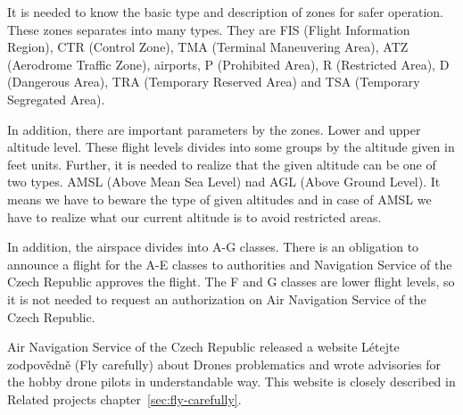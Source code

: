 It is needed to know the basic type and description of zones for safer operation. %
These zones separates into many types. %
They are FIS (Flight Information Region), CTR (Control Zone), TMA (Terminal Maneuvering Area), ATZ (Aerodrome Traffic Zone), airports, P (Prohibited Area), R (Restricted Area), D (Dangerous Area), TRA (Temporary Reserved Area) and TSA (Temporary Segregated Area).\cite{airspace}

In addition, there are important parameters by the zones.
Lower and upper altitude level.
These flight levels divides into some groups by the altitude given in feet units. %
Further, it is needed to realize that the given altitude can be one of two types. %
AMSL (Above Mean Sea Level) nad AGL (Above Ground Level).
It means we have to beware the type of given altitudes and in case of AMSL we have to realize what our current altitude is to avoid restricted areas.

In addition, the airspace divides into A-G classes.\cite{airspace} %
There is an obligation to announce a flight for the A-E classes to authorities and Navigation Service of the Czech Republic approves the flight. %
The F and G classes are lower flight levels, so it is not needed to request an authorization on Air Navigation Service of the Czech Republic. %

Air Navigation Service of the Czech Republic released a website L{\' e}tejte zodpov{\v e}dn{\v e} (Fly carefully) about Drones problematics and wrote advisories for the hobby drone pilots in understandable way.
This website is closely described in Related projects chapter~\ref{sec:fly-carefully}.



